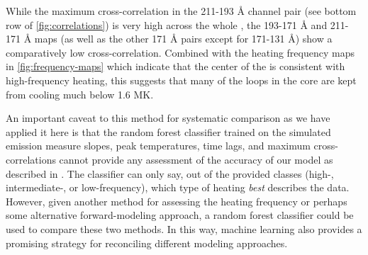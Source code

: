
While the maximum cross-correlation in the 211-193 \AA{} channel pair (see bottom row of \autoref{fig:correlations}) is very high across the whole \AR{}, the 193-171 \AA{} and 211-171 \AA{} maps (as well as the other 171 \AA{} pairs except for 171-131 \AA{}) show a comparatively low cross-correlation.
Combined with the heating frequency maps in \autoref{fig:frequency-maps} which indicate that the center of the \AR{} is consistent with high-frequency heating, this suggests that many of the loops in the core are kept from cooling much below 1.6 MK.

An important caveat to this method for systematic comparison as we have applied it here is that the random forest classifier trained on the simulated emission measure slopes, peak temperatures, time lags, and maximum cross-correlations cannot provide any assessment of the accuracy of our model as described in .
The classifier can only say, out of the provided classes (high-, intermediate-, or low-frequency), which type of heating \textit{best} describes the data.
However, given another method for assessing the heating frequency or perhaps some alternative forward-modeling approach, a random forest classifier could be used to compare these two methods.
In this way, machine learning also provides a promising strategy for reconciling different modeling approaches.
